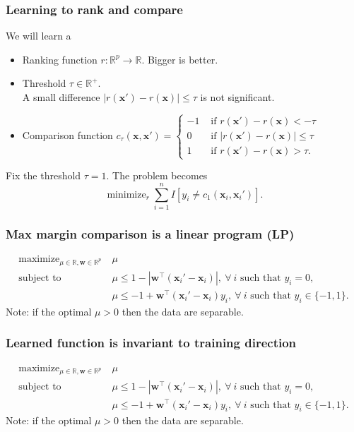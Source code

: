 \documentclass{beamer}
\DeclareMathOperator*{\maximize}{maximize}
\DeclareMathOperator*{\minimize}{minimize}
\newcommand{\RR}{\mathbb R}
\begin{document}
\begin{frame}
  \frametitle{Learning to rank and compare}
  We will learn a
  \begin{itemize}
  \item Ranking function $r:\RR^p\rightarrow\RR$. Bigger is better.
  \item Threshold $\tau\in\RR^+$. \\A small difference
    $|r(\mathbf x')-r(\mathbf x)|\leq \tau$ is not significant.
  \item Comparison function $c_\tau(\mathbf x, \mathbf x') =
  \begin{cases}
    -1 & \text{ if }r(\mathbf x')-r(\mathbf x) < -\tau\\
    0 & \text{ if }|r(\mathbf x')-r(\mathbf x)|\leq \tau\\
    1 & \text{ if }r(\mathbf x')-r(\mathbf x) > \tau.
  \end{cases}
$
\end{itemize}
Fix the threshold $\tau=1$. The problem becomes
$$\minimize_{r} \sum_{i=1}^n 
I\left[ y_i\neq c_1(\mathbf x_i, \mathbf x_i') \right].$$
\end{frame}

\begin{frame}
  \frametitle{Max margin comparison is a linear program (LP)}
  
  \vskip -2.2cm
  \begin{equation*}
  \begin{aligned}
    \maximize_{\mu\in\RR, \mathbf w\in\RR^p}\ & \mu \\
    \text{subject to}\ & 
    \mu \leq 1-|\mathbf w^\intercal (\mathbf x_i' - \mathbf x_i)|,\
    \forall\  i\text{ such that }y_i=0,\\
    &\mu \leq -1 +  
    \mathbf w^\intercal(\mathbf x_i'-\mathbf x_i)y_i,
    \ \forall\ i\text{ such that }y_i\in\{-1,1\}.
  \end{aligned}
\end{equation*}
Note: if the optimal $\mu>0$ then the data are separable.
\end{frame}

\begin{frame}
  \frametitle{Learned function is invariant to training direction}
  
  \vskip -2.2cm
  \begin{equation*}
  \begin{aligned}
    \maximize_{\mu\in\RR, \mathbf w\in\RR^p}\ & \mu \\
    \text{subject to}\ & 
    \mu \leq 1-|\mathbf w^\intercal (\mathbf x_i' - \mathbf x_i)|,\
    \forall\  i\text{ such that }y_i=0,\\
    &\mu \leq -1 +  
    \mathbf w^\intercal(\mathbf x_i'-\mathbf x_i)y_i,
    \ \forall\ i\text{ such that }y_i\in\{-1,1\}.
  \end{aligned}
\end{equation*}
Note: if the optimal $\mu>0$ then the data are separable.
\end{frame}
\end{document}
